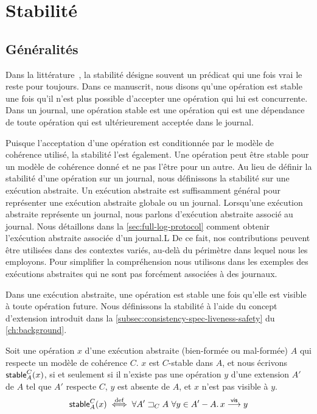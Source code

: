 \section{Stabilité}\label{sec:stability}

\subsection{Généralités}\label{subsec:general-stability}

Dans la littérature~\autocite{baquero_2018_pure-op-crdt, shapiro_2011_crdt,birman_1991_causalmulticast}, la stabilité désigne souvent un prédicat qui une fois vrai le reste pour toujours.
Dans ce manuscrit, nous disons qu'une opération est stable une fois qu'il n'est plus possible d'accepter une opération qui lui est concurrente.
Dans un journal, une opération stable est une opération qui est une dépendance de toute opération qui est ultérieurement acceptée dans le journal.

Puisque l'acceptation d'une opération est conditionnée par le modèle de cohérence utilisé, la stabilité l'est également.
Une opération peut être stable pour un modèle de cohérence donné et ne pas l'être pour un autre.
Au lieu de définir la stabilité d'une opération sur un journal, nous définissons la stabilité sur une exécution abstraite.
Un exécution abstraite est suffisamment général pour représenter une exécution abstraite globale ou un journal.
Lorsqu'une exécution abstraite représente un journal, nous parlons d'exécution abstraite associé au journal.
Nous détaillons dans la \autoref{sec:full-log-protocol} comment obtenir l'exécution abstraite associée d'un journal.L
De ce fait, nos contributions peuvent être utilisées dans des contextes variés, au-delà du périmètre dans lequel nous les employons.
Pour simplifier la compréhension nous utilisons dans les exemples des exécutions abstraites qui ne sont pas forcément associées à des journaux.

Dans une exécution abstraite, une opération est stable une fois qu'elle est visible à toute opération future.
Nous définissons la stabilité à l'aide du concept d'extension introduit dans la \autoref{subsec:consistency-spec-liveness-safety} du \autoref{ch:background}.

\begin{definition}\label{def:stable}
Soit une opération $x$ d'une exécution abstraite (bien-formée ou mal-formée) $A$ qui respecte un modèle de cohérence $C$.
$x$ est $C$-stable dans $A$, et nous écrivons $\operatorname{\mathsf{stable}}_A^C(x)$, si et seulement si il n'existe pas une opération $y$ d'une extension $A'$ de $A$ tel que $A'$ respecte $C$, $y$ est absente de $A$, et $x$ n'est pas visible à $y$.
\begin{equation*}
  \operatorname{\mathsf{stable}}_A^C(x) \overset{\mathrm{def}}{\iff} \forall A' \sqsupset_C A\ \forall y \in A' - A \ldotp x \overset{\mathsf{vis}}{\longrightarrow} y
\end{equation*}
\end{definition}


